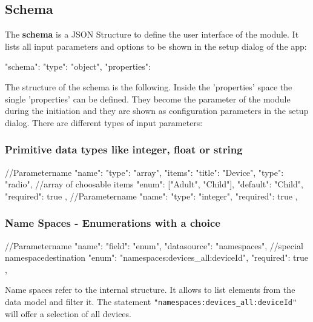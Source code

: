 \subsection{Schema}

The \textbf{schema} is a JSON Structure to define the user interface of the module.
It lists all input parameters and  options to be shown in the setup dialog of the app:

\begin{listingverbatim}
{
  "schema": {
    "type": "object",
    "properties": {
    }
  }
}
\end{listingverbatim}


The structure of the schema is the following. Inside the 'properties' space the single 'properties' 
can be defined. They become the parameter of the module during the initiation and they 
are shown as configuration parameters in the setup dialog. There are different
types of input parameters:


\subsubsection{Primitive data types like integer, float or string}

\begin{listingverbatim}
{
  //Parametername
  "name": {
    "type": "array",
    "items": {
      "title": "Device",
      "type": "radio",
      //array of choosable items
      "enum": ["Adult", "Child"],
      "default": "Child",
      "required": true
    }
  },
  //Parametername
  "name": {
    "type": "integer",
    "required": true
  },
}
\end{listingverbatim}

\subsubsection{Name Spaces  - Enumerations with a choice}

\begin{listingverbatim}
{
  //Parametername
  "name": {
    "field": "enum",
    "datasource": "namespaces",
    //special namespacedestination
    "enum": "namespaces:devices\_all:deviceId",
    "required": true
  },
}
\end{listingverbatim}



Name spaces refer to the internal \zway structure. It allows to list elements from 
the \zway data model and filter it. The statement 
\texttt{"namespaces:devices\_all:deviceId"} will offer a selection of all devices.

